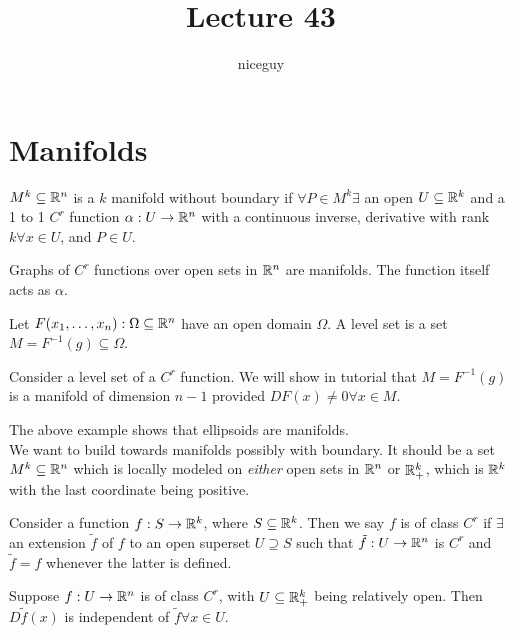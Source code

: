\documentclass[12pt]{article}
\title{Lecture 43}
\author{niceguy}
\begin{document}
\maketitle

\section{Manifolds}

$M^k \subseteq \mathbb{R}^n$ is a $k$ manifold without boundary if $\forall P \in M^k \exists $ an open $U \subseteq \mathbb{R}^k$ and a 1 to 1 $C^r$ function $\alpha:U \rightarrow \mathbb{R}^n$ with a continuous inverse, derivative with rank $k \forall x \in U$, and $P \in U$.

\begin{ex}
    Graphs of $C^r$ functions over open sets in $\mathbb{R}^n$ are manifolds. The function itself acts as $\alpha$.
\end{ex}

\begin{defn}
    Let $F(x_1,\dots,x_n): \Omega \subseteq \mathbb{R}^n$ have an open domain $\Omega$. A level set is a set $M = F^{-1}(g) \subseteq \Omega$.
\end{defn}

\begin{ex}
    Consider a level set of a $C^r$ function. We will show in tutorial that $M = F^{-1}(g)$ is a manifold of dimension $n-1$ provided $DF(x) \neq 0 \forall x \in M$.
\end{ex}

The above example shows that ellipsoids are manifolds. \\

We want to build towards manifolds possibly with boundary. It should be a set $M^k \subseteq \mathbb{R}^n$ which is locally modeled on \textit{either} open sets in $\mathbb{R}^n$ or $\mathbb{R}^k_+$, which is $\mathbb{R}^k$ with the last coordinate being positive.

\begin{defn}
    Consider a function $f: S \rightarrow \mathbb{R}^k$, where $S \subseteq \mathbb{R}^k$. Then we say $f$ is of class $C^r$ if $\exists$ an extension $\tilde f$ of $f$ to an open superset $U \supseteq S$ such that $\tilde f:U \rightarrow \mathbb{R}^n$ is $C^r$ and $\tilde f = f$ whenever the latter is defined.
\end{defn}

\begin{lem}
    Suppose $f: U \rightarrow \mathbb{R}^n$ is of class $C^r$, with $U \subseteq \mathbb{R}^k_+$ being relatively open. Then $D\tilde f(x)$ is independent of $\tilde f \forall x \in U$.
\end{lem}
\end{document}
